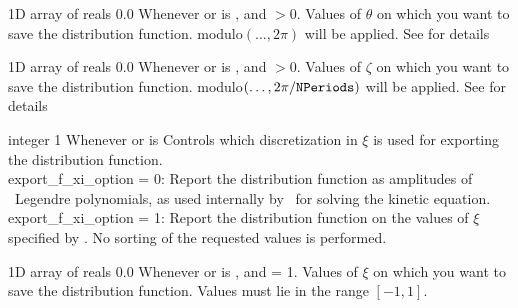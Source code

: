 \myhrule

{1D array of reals}
{0.0}
{Whenever  or  is \true, and  $>0$.}
{Values of $\theta$ on which you want to save the distribution function.  modulo$(\ldots, 2\pi)$ will be applied.  See  for details}


\myhrule

{1D array of reals}
{0.0}
{Whenever  or  is \true, and  $>0$.}
{Values of $\zeta$ on which you want to save the distribution function.  modulo$(\ldots, 2\pi/\mbox{\ttfamily NPeriods})$ will be applied.  See  for details}

\myhrule

{integer}
{1}
{Whenever  or  is \true}
{Controls which discretization in $\xi$ is used for exporting the distribution function.\\

{\ttfamily export\_f\_xi\_option} = 0: Report the distribution function as amplitudes of \Nxi~Legendre polynomials, as used internally by \sfincs~for solving the kinetic equation.\\

{\ttfamily export\_f\_xi\_option} = 1: Report the distribution function on the values of $\xi$ specified by . No sorting of the requested values is performed.
}

\myhrule

{1D array of reals}
{0.0}
{Whenever  or  is \true, and  = 1.}
{Values of $\xi$ on which you want to save the distribution function.  Values must lie in the range $[-1,1]$.}

\myhrule

